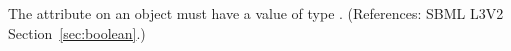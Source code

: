 The attribute  on an \Event object
must have a value of type .  (References: SBML L3V2
Section~\ref{sec:boolean}.)
